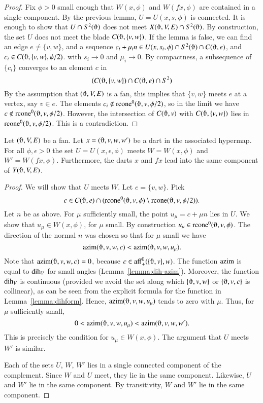 \begin{proof}  Fix $\phi>0$ small enough that $W(x,\phi)$
and $W(f x,\phi)$ are contained in a single component.
By the previous lemma, $U=U(x,s,\phi)$ 
is connected.  
It is enough to
show that $U\cap S^2(\orgn)$  does not meet $X(\orgn,V,E) \cap S^2(\orgn)$.
By construction, the set $U$ does not meet the blade
$C(\orgn,\{v,w\})$.  If the lemma is false, we can find an
edge $e\ne \{v,w\}$,
and
a sequence $c_i + \mu_i n \in U(x,s_i,\phi)\cap S^2(\orgn)
\cap C(\orgn,e)$, and $c_i\in C(\orgn,\{v,w\},\phi/2)$. 
with $s_i \to 0$ and $\mu_i\to 0$. 
By compactness, a subsequence
of  $\{c_i\}$ converges to an
element $c$ in 
  $$(C(\orgn,\{v,w\})\cap C(\orgn,e)\cap S^2)
  $$
By the assumption that  $(\orgn,V,E)$ is a fan, this
implies that $\{v,w\}$ meets $e$ at a vertex, say $v\in e$.
The elements $c_i\not\in \op{rcone}^0(\orgn,v,\phi/2)$, so
in the limit we have $c\not\in\op{rcone}^0(\orgn,v,\phi/2)$.
However, the intersection of $C(\orgn,v)$ with $C(\orgn,\{v,w\})$
lies in $\op{rcone}^0(\orgn,v,\phi/2)$.  This is a contradiction.
\end{proof}

\begin{lemma}
Let $(\orgn,V,E)$ be a fan.
Let $x=(\orgn,v,w,w')$ be a dart in the associated hypermap.
For all $\phi,\epsilon > 0$
the set $U=U(x,\epsilon,\phi)$ meets $W=W(x,\phi)$ and 
$W'=W(f x,\phi)$.
Furthermore, the darts $x$ and $f x$ lead into the same
component of $Y(\orgn,V,E)$.
\end{lemma}

\begin{proof}
We will show that $U$ meets $W$.    Let $e=\{v,w\}$. Pick 
 $$c\in C(\orgn,e) \cap 
      (\op{rcone}^0(\orgn,v,\phi)\setminus \op{rcone}(\orgn,v,\phi/2)).
 $$
Let $n$ be as above.  For $\mu$ sufficiently small, the point
$u_\mu=c + \mu n$ lies in  $U$.  We show that $u_\mu\in W(x,\phi)$, for $\mu$ small.
By construction $u_\mu\in \op{rcone}^0(\orgn,v,\phi)$.
The direction of the normal $n$ was chosen so that for $\mu$ small
we have
   $$
   \op{azim}(\orgn,v,w,c) < \op{azim}(\orgn,v,w,u_\mu).
   $$
Note that $\op{azim}(\orgn,v,w,c) = 0$, because 
$c\in\op{aff}_+^0(\{\orgn,v\},w)$. 
The function ${\operatorname{azim}}$ is equal to ${\operatorname{dih}}_V$ for
small angles (Lemma~\ref{lemma:dih-azim}).  Moreover,
the function $\operatorname{dih}_V$ is continuous (provided
we avoid the set along which $\{\orgn,v,w\}$ or $\{\orgn,v,c\}$ is
collinear), as can be seen
from the explicit formula 
for the function in Lemma~\ref{lemma:dihform}.
Hence, $\op{azim}(\orgn,v,w,u_\mu)$ tends to zero with $\mu$.
Thus, for $\mu$ sufficiently small,
   $$
   0 < \op{azim}(\orgn,v,w,u_\mu) < \op{azim}(\orgn,v,w,w').
   $$
This is precisely the condition for $u_\mu\in W(x,\phi)$.
The argument that $U$ meets
$W'$ is similar.

Each of the sets $U$, $W$, $W'$ lies in a single connected
component of the complement.  Since $W$ and $U$ meet, they
lie in the same component.  Likewise, $U$ and $W'$ lie in the
same component.  By transitivity, $W$ and $W'$ lie in the same
component.
\end{proof}

